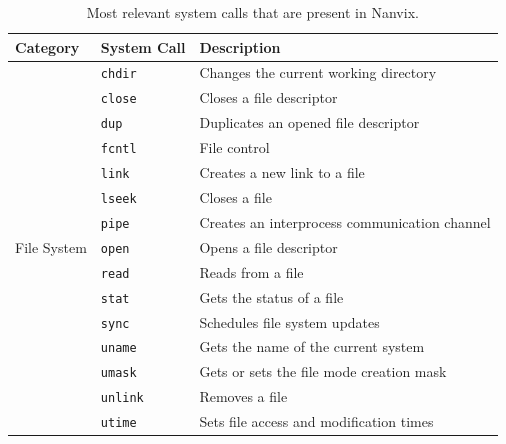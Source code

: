 \documentclass[10pt,a4paper]{article}
\begin{document}
\begin{table}[b]
\small
\centering
\caption{Most relevant system calls that are present in Nanvix.}
\label{table: most relevant system calls in nanvix}
\begin{tabular}{l l l}
	\toprule
	Category & System Call & Description \\
	\midrule
	\multirow{17}{*}{File System}        & \texttt{chdir}    & Changes the current working directory               \\
	                                     & \texttt{close}    & Closes a file descriptor                            \\
	                                     & \texttt{dup}      & Duplicates an opened file descriptor                \\
	                                     & \texttt{fcntl}    & File control                                        \\
	                                     & \texttt{link}     & Creates a new link to a file                        \\
	                                     & \texttt{lseek}    & Closes a file                                       \\
	                                     & \texttt{pipe}     & Creates an interprocess communication channel       \\
	                                     & \texttt{open}     & Opens a file descriptor                             \\
	                                     & \texttt{read}     & Reads from a file                                   \\
	                                     & \texttt{stat}     & Gets the status of a file                           \\
	                                     & \texttt{sync}     & Schedules file system updates                       \\
	                                     & \texttt{uname}    & Gets the name of the current system                 \\
	                                     & \texttt{umask}    & Gets or sets the file mode creation mask            \\
	                                     & \texttt{unlink}   & Removes a file                                      \\
	                                     & \texttt{utime}    & Sets file access and modification times             \\

\end{tabular}
\end{table}
\end{document}
